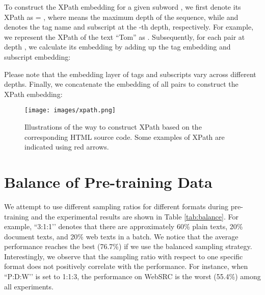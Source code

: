 \documentclass[11pt]{article}
\begin{document}
To construct the XPath embedding for a given subword , we first denote its XPath as  = , where  means the maximum depth of the sequence, while  and  denotes the tag name and subscript at the -th depth, respectively. For example, we represent the XPath of the text ``Tom'' as . Subsequently, for each pair  at depth , we calculate its embedding  by adding up the tag embedding and subscript embedding:


Please note that the embedding layer of tags and subscripts vary across different depths. Finally, we concatenate the embedding of all pairs to construct the XPath embedding:



\begin{figure}[ht]
    \centering
    \texttt{[image: images/xpath.png]}
    \caption{Illustrations of the way to construct XPath based on the corresponding HTML source code. Some examples of XPath are indicated using red arrows.}
    \label{fig:xpath}
\end{figure}



\section{Balance of Pre-training Data} 
\label{sec:balance}
We attempt to use different sampling ratios for different formats during pre-training and the experimental results are shown in Table \ref{tab:balance}. For example, ``3:1:1’’ denotes that there are approximately 60\% plain texts, 20\% document texts, and 20\% web texts in a batch. We notice that the average performance reaches the best (76.7\%) if we use the balanced sampling strategy. Interestingly, we observe that the sampling ratio with respect to one specific format does not positively correlate with the performance. For instance, when ``P:D:W’’ is set to 1:1:3, the performance on WebSRC is the worst (55.4\%) among all experiments. 


\begin{table}[h]
\centering
{}
\caption{Results on the balance of pre-training datasets. P:D:W denotes the ratio of plain, document, and web texts in a batch, respectively.}
\label{tab:balance}
\end{table}
\end{document}
